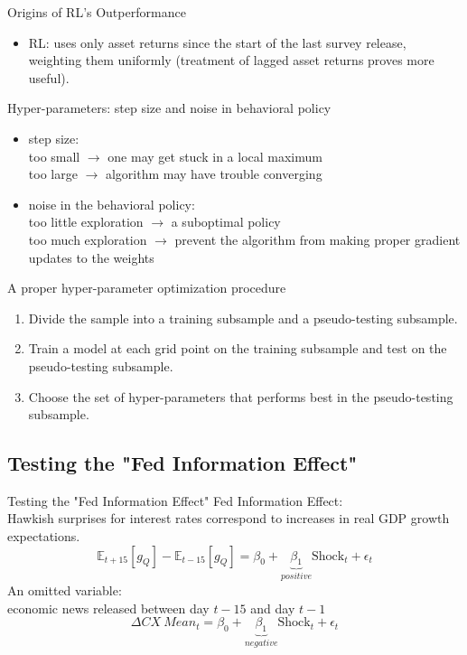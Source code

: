 \documentclass[UTF8, 16pt]{beamer}
\begin{document}
\begin{CJK*}{UTF8}{gbsn}
\begin{frame}{Origins of RL’s Outperformance}
\begin{itemize}
\begin{itemize}
				\item RL: uses only asset returns since the start of the last survey release, weighting them uniformly (\alert{treatment of lagged asset returns proves more useful}).
			\end{itemize}
	\end{itemize}
\end{frame}
\begin{frame}{Hyper-parameters: step size and noise in behavioral policy}
	\begin{itemize}
		\item step size: 
			\\ too small $\rightarrow$ one may get stuck in a local maximum
			\\ too large $\rightarrow$ algorithm may have trouble converging
		\item noise in the behavioral policy: 
			\\ too little exploration $\rightarrow$ a suboptimal policy
			\\ too much exploration $\rightarrow$ prevent the algorithm from making proper gradient updates to the weights
	\end{itemize}
	A proper hyper-parameter optimization procedure
	\begin{enumerate}
		\item Divide the sample into a \alert{training subsample} and a \alert{pseudo-testing subsample}.
		\item Train a model at each grid point on the training subsample and test on the pseudo-testing subsample.
		\item Choose the set of hyper-parameters that performs best in the pseudo-testing subsample.
	\end{enumerate}
\end{frame}
\subsection{Testing the "Fed Information Effect"}
\begin{frame}{Testing the "Fed Information Effect"}
	Fed Information Effect:\\ \alert{Hawkish surprises} for interest rates correspond to \alert{increases} in real GDP growth expectations.
	$$
	\mathbb{E}_{t+15}\left[g_{Q}\right]-\mathbb{E}_{t-15}\left[g_{Q}\right]=\beta_{0}+\underbrace{\beta_{1}}_{positive} \text{Shock}_{t}+\epsilon_{t}
	$$
	An omitted variable: \\
	\alert{economic news} released between day $t-15$ and day $t-1$
	$$
	\Delta CX\ Mean _{t}=\beta_{0}+\underbrace{\beta_{1}}_{negative} \text{Shock}_{t}+\epsilon_{t}
	$$
\end{frame}


\end{CJK*}
\end{document}
